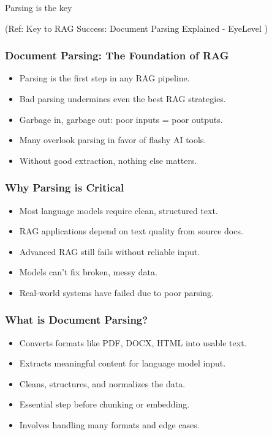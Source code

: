 \begin{frame}[fragile]\frametitle{}
\begin{center}
{\Large Parsing is the key}

{\tiny (Ref: Key to RAG Success: Document Parsing Explained - EyeLevel )}
\end{center}
\end{frame}

\begin{frame}[fragile]\frametitle{Document Parsing: The Foundation of RAG}
  \begin{itemize}
    \item Parsing is the first step in any RAG pipeline.
    \item Bad parsing undermines even the best RAG strategies.
    \item Garbage in, garbage out: poor inputs = poor outputs.
    \item Many overlook parsing in favor of flashy AI tools.
    \item Without good extraction, nothing else matters.
  \end{itemize}
\end{frame}

\begin{frame}[fragile]\frametitle{Why Parsing is Critical}
  \begin{itemize}
    \item Most language models require clean, structured text.
    \item RAG applications depend on text quality from source docs.
    \item Advanced RAG still fails without reliable input.
    \item Models can't fix broken, messy data.
    \item Real-world systems have failed due to poor parsing.
  \end{itemize}
\end{frame}

\begin{frame}[fragile]\frametitle{What is Document Parsing?}
  \begin{itemize}
    \item Converts formats like PDF, DOCX, HTML into usable text.
    \item Extracts meaningful content for language model input.
    \item Cleans, structures, and normalizes the data.
    \item Essential step before chunking or embedding.
    \item Involves handling many formats and edge cases.
  \end{itemize}
\end{frame}

